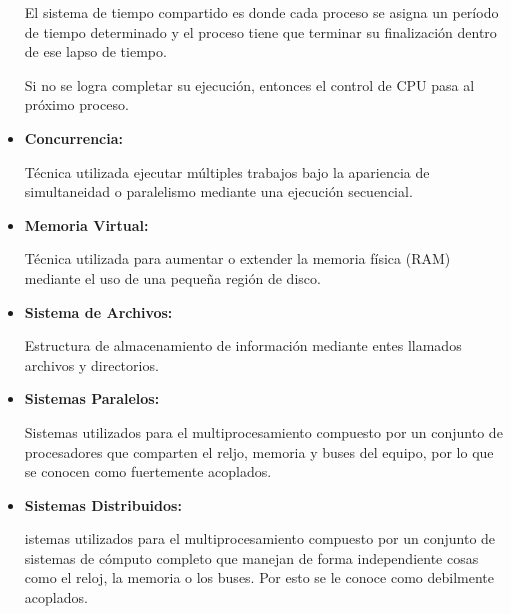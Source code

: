 \documentclass[12pt, fleqn]{report}                             %
\begin{document}
\begin{itemize}
                    El sistema de tiempo compartido es donde cada proceso se asigna un período de
                    tiempo determinado y el proceso tiene que terminar su finalización dentro de ese
                    lapso de tiempo.

                    Si no se logra completar su ejecución, entonces el control de CPU pasa al
                    próximo proceso.

                \item
                    \textbf{Concurrencia: }

                    Técnica utilizada ejecutar múltiples trabajos bajo la apariencia de
                    simultaneidad o paralelismo mediante una ejecución secuencial.

                \item
                    \textbf{Memoria Virtual: }

                    Técnica utilizada para aumentar o extender la memoria física (RAM) mediante
                    el uso de una pequeña región de disco.

                \item
                    \textbf{Sistema de Archivos: }

                    Estructura de almacenamiento de información mediante entes llamados
                    archivos y directorios.

                \item
                    \textbf{Sistemas Paralelos: }

                    Sistemas utilizados para el multiprocesamiento compuesto por un conjunto
                    de procesadores que comparten el reljo, memoria y buses del equipo, por lo
                    que se conocen como fuertemente acoplados.

                \item
                    \textbf{Sistemas Distribuidos: }

                    istemas utilizados para el multiprocesamiento compuesto por un conjunto
                    de sistemas de cómputo completo que manejan de forma independiente cosas
                    como el reloj, la memoria o los buses. Por esto se le conoce como debilmente
                    acoplados.

            \end{itemize}



\end{document}

